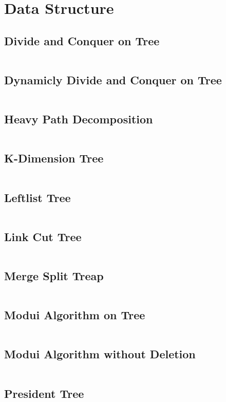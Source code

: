 \documentclass[a4paper,openany]{book}
\newcommand{\cppcode}[1]
{
  \inputminted[mathescape,
  tabsize=4,
  linenos,
  framesep=2mm,
  breakaftergroup=true,
  breakautoindent=true,
  breakbytoken=true,
  breaklines=true,
  fontsize=\small
  ]{cpp}{Source/#1}
}
\begin{document}
\chapter{Data Structure}
\section{Divide and Conquer on Tree}
\cppcode{/Data Structure/Divide and Conquer on Tree.cpp}
\section{Dynamicly Divide and Conquer on Tree}
\cppcode{/Data Structure/Dynamicly Divide and Conquer on Tree.cpp}
\section{Heavy Path Decomposition}
\cppcode{/Data Structure/Heavy Path Decomposition.cpp}
\section{K-Dimension Tree}
\cppcode{/Data Structure/K-Dimension Tree.cpp}
\section{Leftlist Tree}
\cppcode{/Data Structure/Leftlist Tree.cpp}
\section{Link Cut Tree}
\cppcode{/Data Structure/Link Cut Tree.cpp}
\section{Merge Split Treap}
\cppcode{/Data Structure/Merge Split Treap.cpp}
\section{Modui Algorithm on Tree}
\cppcode{/Data Structure/Modui Algorithm on Tree.cpp}
\section{Modui Algorithm without Deletion}
\cppcode{/Data Structure/Modui Algorithm without Deletion.cpp}
\section{President Tree}
\cppcode{/Data Structure/President Tree.cpp}
\end{document}

